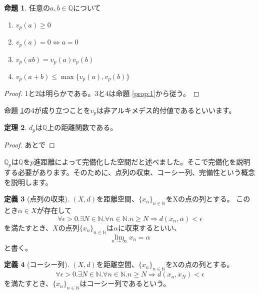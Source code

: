\documentclass[uplatex]{jsarticle}
\newcommand{\Q}{\mathbb{Q}}
\theoremstyle{definition} %
\newtheorem{thm}{定理}
\newtheorem{defi}[thm]{定義}
\newtheorem{prop}[thm]{命題}
\begin{document}
\begin{oframed}\begin{prop}\label{prop:2}
任意の$a, b \in \Q$について
\begin{enumerate}
\item $v_p(a) \geq 0$
\item $v_p(a) = 0 \iff a = 0$
\item $v_p(ab) = v_p(a) v_p(b)$
\item $v_p(a+b) \leq \max\{v_p(a), v_p(b)\}$
\end{enumerate}
\end{prop}\end{oframed}
\begin{proof}
1と2は明らかである。3と4は命題 \ref{prop:1}から従う。
\end{proof}

命題 \ref{prop:2}の4が成り立つことを$v_p$は非アルキメデス的付値であるといいます。

\begin{oframed}\begin{thm}
$d_p$は$\Q$上の距離関数である。
\end{thm}\end{oframed}
\begin{proof}
あとで
\end{proof}

$\Q_p$は$\Q$を$p$進距離によって完備化した空間だと述べました。そこで完備化を説明する必要があります。そのために、点列の収束、コーシー列、完備性という概念を説明します。

\begin{oframed}\begin{defi}[点列の収束]
$(X, d)$を距離空間、$\{x_n\}_{n\in\mathbb{N}}$をXの点の列とする。
このとき$\alpha \in X$が存在して
\[
\forall \epsilon>0. \exists N\in\mathbb{N}. \forall n \in \mathbb{N}. n \geq N \Rightarrow d(x_n, \alpha) < \epsilon
\]
を満たすとき、$X$の点列$\{x_n\}_{n\in\mathbb{N}}$は$\alpha$に収束するといい、
\[
\lim_{n \to \infty} x_n = \alpha
\]
と書く。
\end{defi}\end{oframed}

\begin{oframed}\begin{defi}[コーシー列]
$(X, d)$を距離空間、$\{x_n\}_{n\in\mathbb{N}}$をXの点の列とする。
\[
\forall \epsilon>0. \exists N\in\mathbb{N}. \forall n \in \mathbb{N}. n \geq N \Rightarrow d(x_n, x_N) < \epsilon
\]
を満たすとき、$\{x_n\}_{n\in\mathbb{N}}$はコーシー列であるという。
\end{defi}\end{oframed}
\end{document}
